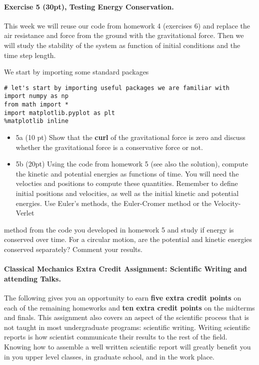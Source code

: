\documentclass[%
oneside,                 %
final,                   %
10pt]{article}
\begin{document}
\noindent
\paragraph{Exercise 5 (30pt), Testing Energy Conservation.}
This week we will reuse our code from homework 4 (exercises 6)
and replace the air resistance and force from the ground with the
gravitational force. Then we will study the stability of the system as function of initial conditions and the time step length.

We start by importing some standard packages
\begin{verbatim}
# let's start by importing useful packages we are familiar with
import numpy as np
from math import *
import matplotlib.pyplot as plt
%matplotlib inline
\end{verbatim}

\begin{itemize}
\item 5a (10 pt) Show that the \textbf{curl} of the gravitational force is zero and discuss whether the gravitational force is  a conservative force or not.

\item 5b (20pt) Using the code from homework 5 (see also the solution), compute the kinetic and potential energies as functions of time. You will need the velocties and positions to compute these quantities. Remember to define initial positions and velocities, as well as the  initial kinetic and potential energies. Use Euler's methods, the Euler-Cromer method or the Velocity-Verlet
\end{itemize}

\noindent
method from the code you developed in homework 5 and study if energy is conserved over time. For a circular motion, are the potential and kinetic energies conserved separately? Comment your results.




\paragraph{Classical Mechanics Extra Credit Assignment: Scientific Writing and attending Talks.}
The following gives you an opportunity to earn \textbf{five extra credit
points} on each of the remaining homeworks and \textbf{ten extra credit points}
on the midterms and finals.  This assignment also covers an aspect of
the scientific process that is not taught in most undergraduate
programs: scientific writing.  Writing scientific reports is how
scientist communicate their results to the rest of the field.  Knowing
how to assemble a well written scientific report will greatly benefit
you in you upper level classes, in graduate school, and in the work
place.
\end{document}
